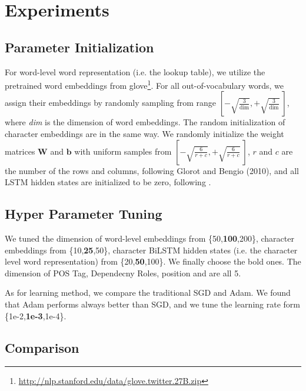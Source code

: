 \section{Experiments}
\label{sec:eval}

\subsection{Parameter Initialization}
For word-level word representation (i.e. the lookup table), 
we utilize the pretrained word embeddings from glove\footnote{\url{http://nlp.stanford.edu/data/glove.twitter.27B.zip}}.
For all out-of-vocabulary words, we assign their embeddings by randomly sampling from range $\left[-\sqrt{\frac{3}{\text{dim}}}, +\sqrt{\frac{3}{\text{dim}}}~\right]$, where \textit{dim} is the dimension of word embeddings. The random initialization of character embeddings are in the same way.
We randomly initialize the weight matrices $\mathbf{W}$ and $\mathbf{b}$ with uniform samples from 
$\left[-\sqrt{\frac{6}{r+c}}, +\sqrt{\frac{6}{r+c}}~\right]$, 
$r$ and $c$ are the number of the rows and columns, following Glorot and Bengio (2010), and all LSTM hidden states are initialized to be zero, following . 


\subsection{Hyper Parameter Tuning}
We tuned the dimension of word-level embeddings from \{50,\textbf{100},200\}, character embeddings from \{10,\textbf{25},50\}, character BiLSTM hidden states (i.e. the character level word representation)  from  \{20,\textbf{50},100\}. 
We finally choose the bold ones.
The dimension of POS Tag, Dependecny Roles, position and  are all 5.

As for learning method, we compare the traditional SGD and Adam.
We found that Adam performs always better than SGD, and we tune the learning rate form \{1e-2,\textbf{1e-3},1e-4\}.

\subsection{Comparison} 

